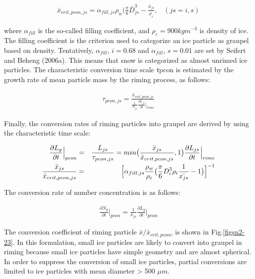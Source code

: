 \begin{eqnarray}
\bar{x}_{crit,pcon,js}=\alpha_{fill,js}\rho_{w}\bigl(\frac{\pi}{6}\bar{D}_{js}^{3}-\frac{\bar{x}_{js}}{\rho_{\varepsilon}},\;\;\;(js=i,s)\label{sn207}
\end{eqnarray}

where $\alpha_{fill}$ is the so-called filling coefficient, and $\rho_{\varepsilon} = 900 kg m^{-3}$ is density of ice. The filling coefficient is the criterion used to categorize an ice particle as graupel based on density. Tentatively, $\alpha_{fill}$, $i = 0.68$ and $\alpha_{fill}$, $s = 0.01$ are set by Seifert and Beheng (2006a). This means that snow is categorized as almost unrimed ice particles. The characteristic conversion time scale τpcon is estimated by the growth rate of mean particle mass by the riming process, as follows:

\begin{eqnarray}
\tau_{pcon,js}=\frac{\bar{x}_{crit,pcon,js}}{\frac{1}{N_{js}}\frac{\partial L_{js}}{\partial t}\Bigr|_{rime}}\label{sn208}
\end{eqnarray}

Finally, the conversion rates of riming particles into graupel are derived by using the characteristic time scale:

\begin{eqnarray}
\frac{\partial L_{g}}{\partial t}\Bigr|_{pcon}&=&\frac{L_{js}}{\tau_{pcon,js}}=min\bigl(\frac{\bar{x}_{js}}{\bar{x}_{crit,pcon,js}},1\bigr)\frac{\partial L_{js}}{\partial t}\Bigr|_{rime}\label{sn209}\\
\frac{\bar{x}_{js}}{\bar{x}_{crit,pcon,js}}&=&\Bigl[\alpha_{fill,js}\frac{\rho_{w}}{\rho_{\varepsilon}}\bigl(\frac{\pi}{6}D_{i}^{3}\rho_{i}\frac{1}{\bar{x_{js}}}-1\bigr)\Bigr]^{-1}\label{sn210}
\end{eqnarray}

The conversion rate of number concentration is as follows:

\begin{eqnarray}
\frac{\partial N_{g}}{\partial t}\Bigr|_{pcon}=\frac{1}{\bar{x}_{js}}\frac{\partial L_{g}}{\partial t}\Bigr|_{pcon}
\end{eqnarray}

The conversion coefficient of riming particle $\bar{x}/\bar{x}_{crit,pconv}$ is shown in Fig.\ref{figsn2-23}. In this formulation, small ice particles are likely to convert into graupel in riming because small ice particles have simple geometry and are almost spherical. In order to suppress the conversion of small ice particles, partial conversions are limited to ice particles with mean diameter > 500 $\mu m$.

